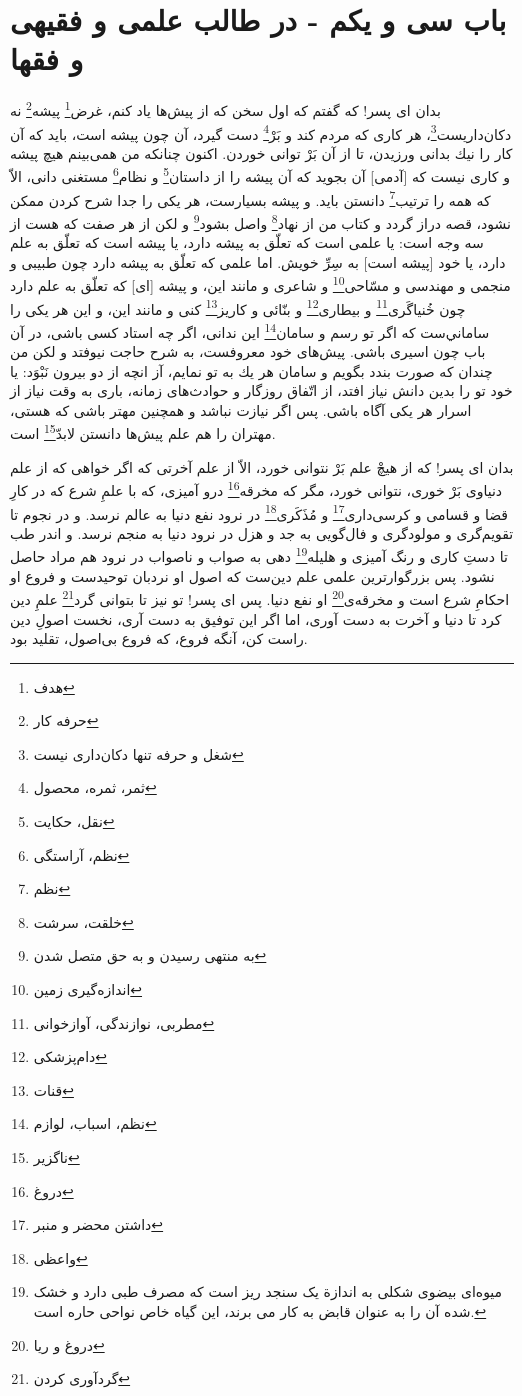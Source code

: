 \section*{باب سى و يكم - 
در طالب علمى و فقيهى و فقها}

بدان اى پسر! كه گفتم كه اول سخن كه از پيش‌ها ياد كنم، غرض\footnote{هدف} پيشه\footnote{حرفه کار} نه دكان‌داريست\footnote{شغل و حرفه تنها دکان‌داری نیست}، هر كارى كه مردم كند و بَرْ\footnote{ثمر، ثمره، محصول} دست گيرد، آن چون پيشه است، بايد كه آن كار را نيك بدانى ورزيدن، تا از آن بَرْ توانى خوردن. اكنون چنانكه من همى‌بينم هيچ پيشه و كارى نيست كه [آدمى] آن بجويد كه آن پيشه را از داستان\footnote{نقل، حکایت} و نظام\footnote{نظم، آراستگی} مستغنى دانى، الاّ كه همه را ترتيب\footnote{نظم} دانستن بايد. و پيشه بسيارست، هر يكى را جدا شرح كردن ممكن نشود، قصه دراز گردد و كتاب من از نهاد\footnote{خلقت، سرشت} واصل بشود\footnote{به منتهی رسیدن و به حق متصل شدن} و لكن از هر صفت كه هست از سه وجه است: يا علمى است كه تعلّق به پيشه دارد، يا پيشه است كه تعلّق به علم دارد، يا خود [پيشه است] به سِرِّ خويش. اما علمى كه تعلّق به پيشه دارد چون طبيبى و منجمى و مهندسى و مسّاحى\footnote{اندازه‌گیری زمین} و شاعرى و مانند اين، و پيشه [اى] كه تعلّق به علم دارد چون خُنياگَرى\footnote{مطربی، نوازندگی، آوازخوانی} و بيطارى\footnote{دام‌پزشکی} و بنّائى و كاريز\footnote{قنات} كنى و مانند اين، و اين هر يكى را ساماني‌ست كه اگر تو رسم و سامان\footnote{نظم، اسباب، لوازم} اين ندانى، اگر چه استاد كسى باشى، در آن باب چون اسيرى باشى. پيش‌هاى خود معروفست، به شرح حاجت نيوفتد و لكن من چندان كه صورت بندد بگويم و سامان هر يك به تو نمايم، آز انچه از دو بيرون نَبْوَد: يا خود تو را بدين دانش نياز افتد، از اتّفاق روزگار و حوادث‌هاى زمانه، بارى به وقت نياز از اسرار هر يكى آگاه باشى. پس اگر نيازت نباشد و همچنين مهتر باشى كه هستى، مهتران را هم علم پيش‌ها دانستن لابدّ\footnote{ناگزیر} است.

بدان اى پسر! كه از هيچْ علم بَرْ نتوانى خورد، الاّ از علم آخرتى كه اگر خواهى كه از علم دنياوى بَرْ خورى، نتوانى خورد، مگر كه مخرقه\footnote{دروغ} درو آميزى، كه با علمِ شرع كه در كارِ قضا و قسامى و كرسى‌دارى\footnote{داشتن محضر و منبر} و مُذَكَرى\footnote{واعظی} در نرود نفع دنيا به عالم نرسد. و در نجوم تا تقويم‌گرى و مولودگرى و فال‌گويى به جد و هزل در نرود دنيا به منجم نرسد. و اندر طب تا دستِ كارى و رنگ آميزى و هليله\footnote{میوه‌ای بیضوی شکلی به اندازة یک سنجد ریز است که مصرف طبی دارد و خشک شده آن را به عنوان قابض به کار می برند، این گیاه خاص نواحی حاره است.} دهى به صواب و ناصواب در نرود هم مراد حاصل نشود. پس بزرگوارترين علمى علم دين‌ست كه اصول او نردبان توحيدست و فروع او احكامِ شرع است و مخرقه‌ی\footnote{دروغ و ریا} او نفع دنيا. پس اى پسر! تو نيز تا بتوانى گرد\footnote{گردآوری کردن} علمِ دين كرد تا دنيا و آخرت به دست آورى، اما اگر اين توفيق به دست آرى، نخست اصولِ دين راست كن، آنگه فروع، كه فروع بى‌اصول، تقليد بود.

